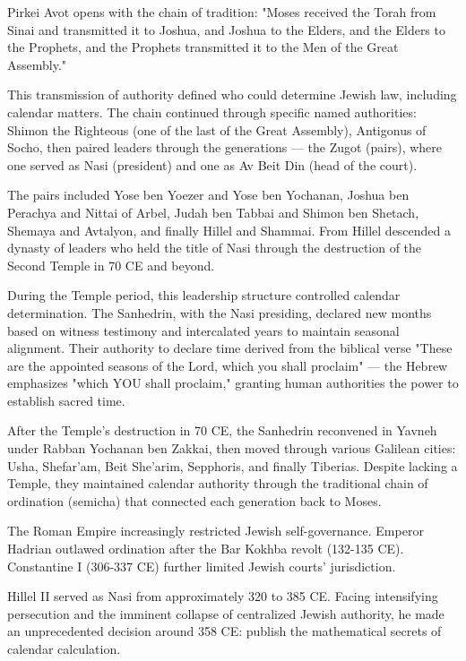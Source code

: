 \begin{historical}
Pirkei Avot opens with the chain of tradition: "Moses received the Torah from Sinai and transmitted it to Joshua, and Joshua to the Elders, and the Elders to the Prophets, and the Prophets transmitted it to the Men of the Great Assembly."

This transmission of authority defined who could determine Jewish law, including calendar matters. The chain continued through specific named authorities: Shimon the Righteous (one of the last of the Great Assembly), Antigonus of Socho, then paired leaders through the generations — the Zugot (pairs), where one served as Nasi (president) and one as Av Beit Din (head of the court).

The pairs included Yose ben Yoezer and Yose ben Yochanan, Joshua ben Perachya and Nittai of Arbel, Judah ben Tabbai and Shimon ben Shetach, Shemaya and Avtalyon, and finally Hillel and Shammai. From Hillel descended a dynasty of leaders who held the title of Nasi through the destruction of the Second Temple in 70 CE and beyond.

During the Temple period, this leadership structure controlled calendar determination. The Sanhedrin, with the Nasi presiding, declared new months based on witness testimony and intercalated years to maintain seasonal alignment. Their authority to declare time derived from the biblical verse "These are the appointed seasons of the Lord, which you shall proclaim" — the Hebrew emphasizes "which YOU shall proclaim," granting human authorities the power to establish sacred time.

After the Temple's destruction in 70 CE, the Sanhedrin reconvened in Yavneh under Rabban Yochanan ben Zakkai, then moved through various Galilean cities: Usha, Shefar'am, Beit She'arim, Sepphoris, and finally Tiberias. Despite lacking a Temple, they maintained calendar authority through the traditional chain of ordination (semicha) that connected each generation back to Moses.

The Roman Empire increasingly restricted Jewish self-governance. Emperor Hadrian outlawed ordination after the Bar Kokhba revolt (132-135 CE). Constantine I (306-337 CE) further limited Jewish courts' jurisdiction.

Hillel II served as Nasi from approximately 320 to 385 CE. Facing intensifying persecution and the imminent collapse of centralized Jewish authority, he made an unprecedented decision around 358 CE: publish the mathematical secrets of calendar calculation.


\end{historical}
